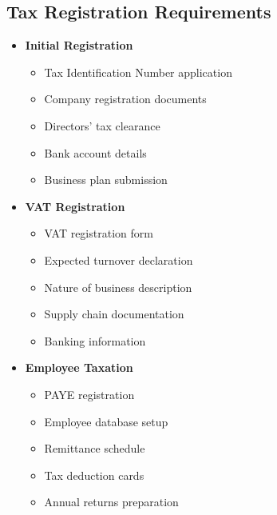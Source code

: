 \subsection{Tax Registration Requirements}\label{subsec:tax-registration}
\vspace{1em}

\begin{tcolorbox}[
    colback=white,
    colframe=primarydark,
    title=\textbf{Federal Inland Revenue Service (FIRS) Requirements},
    before skip=1em,
    after skip=1em
]
    \begin{itemize}[leftmargin=*,itemsep=0.5em]
        \item \textbf{Initial Registration}
        \begin{itemize}[itemsep=0.3em]
            \item Tax Identification Number application
            \item Company registration documents
            \item Directors' tax clearance
            \item Bank account details
            \item Business plan submission
        \end{itemize}

        \vspace{0.5em}

        \item \textbf{VAT Registration}
        \begin{itemize}[itemsep=0.3em]
            \item VAT registration form
            \item Expected turnover declaration
            \item Nature of business description
            \item Supply chain documentation
            \item Banking information
        \end{itemize}

        \vspace{0.5em}

        \item \textbf{Employee Taxation}
        \begin{itemize}[itemsep=0.3em]
            \item PAYE registration
            \item Employee database setup
            \item Remittance schedule
            \item Tax deduction cards
            \item Annual returns preparation
        \end{itemize}


\end{itemize}
\end{tcolorbox}
